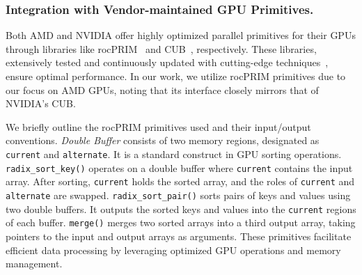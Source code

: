 \begin{comment}
In this section, we aim at sorting a big array of 64-bit integers that do not fit in GPU memory with a GPU.
Our design, illustrated in Figure~\ref{fig:sort-flow}, includes two \texttt{ExKernel}s.
The \texttt{SortExKernel} partitions the input array and sorts each chunk.
The result is put into an intermediate buffer on the CPU.
Then, the \texttt{MergeExKernel} merges these sorted chunks, and outputs back to where the input initially resides.
To emphasize the code reuse capability of our programming model, we do not write any custom GPU kernels and only use the GPU kernels maintained by vendors.
\end{comment}

\subsubsection{\textbf{Integration with Vendor-maintained GPU Primitives.}}
Both AMD and NVIDIA offer highly optimized parallel primitives for their GPUs through libraries like rocPRIM~\cite{rocprim} and CUB~\cite{cub}, respectively. 
These libraries, extensively tested and continuously updated with cutting-edge techniques~\cite{onesweep-2022, mergepath-2012}, ensure optimal performance. 
In our work, we utilize rocPRIM primitives due to our focus on AMD GPUs, noting that its interface closely mirrors that of NVIDIA's CUB.

We briefly outline the rocPRIM primitives used and their input/output conventions.
\textit{Double Buffer} consists of two memory regions, designated as \texttt{current} and \texttt{alternate}. 
It is a standard construct in GPU sorting operations.
\texttt{radix\_sort\_key()} operates on a double buffer where \texttt{current} contains the input array. 
After sorting, \texttt{current} holds the sorted array, and the roles of \texttt{current} and \texttt{alternate} are swapped.
\texttt{radix\_sort\_pair()} sorts pairs of keys and values using two double buffers. 
It outputs the sorted keys and values into the \texttt{current} regions of each buffer.
\texttt{merge()} merges two sorted arrays into a third output array, taking pointers to the input and output arrays as arguments.
These primitives facilitate efficient data processing by leveraging optimized GPU operations and memory management.

